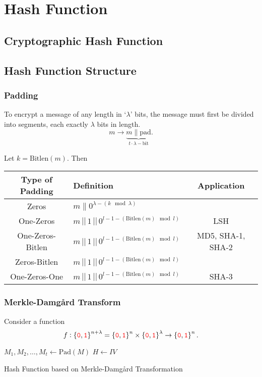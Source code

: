 \chapter{Hash Function}

\section{Cryptographic Hash Function}
\section{Hash Function Structure}

\subsection{Padding}
To encrypt a message of any length in `$\lambda$' bits, the message must first be divided into segments, each exactly $\lambda$ bits in length. \[
m\longrightarrow\underbrace{m\parallel\text{pad}}_{t\cdot\lambda-\text{bit}}.
\]

Let $k=\text{Bitlen}(m)$. Then

\begin{table}[h!]\centering\renewcommand{\arraystretch}{1.25} %
\begin{tabularx}{\textwidth}{@{\extracolsep{\fill}}cXc}
	\hline
	\textbf{Type of Padding} & \textbf{Definition} & \textbf{Application} \\
	\hline
	Zeros & \( m\parallel 0^{\lambda - (k \mod \lambda)} \) & \\
	\hline
	One-Zeros & \( m \,||\, 1 \,||\, 0^{l-1 - (\text{Bitlen}(m) \mod l)} \) & LSH \\
	\hline
	One-Zeros-Bitlen & \( m \,||\, 1 \,||\, 0^{l-1 - (\text{Bitlen}(m) \mod l)} \) & MD5, SHA-1, SHA-2 \\
	\hline
	Zeros-Bitlen & \( m \,||\, 1 \,||\, 0^{l-1 - (\text{Bitlen}(m) \mod l)} \) &  \\
	\hline
	One-Zeros-One & \( m \,||\, 1 \,||\, 0^{l-1 - (\text{Bitlen}(m) \mod l)} \) & SHA-3 \\
	\hline
\end{tabularx}
\end{table}

\subsection{Merkle-Damgård Transform}

Consider a function \[
f:\set{\textcolor{red}{\texttt{0}},\textcolor{red}{\texttt{1}}}^{n+\lambda}=\set{\textcolor{red}{\texttt{0}},\textcolor{red}{\texttt{1}}}^{n}\times\set{\textcolor{red}{\texttt{0}},\textcolor{red}{\texttt{1}}}^\lambda\to\set{\textcolor{red}{\texttt{0}},\textcolor{red}{\texttt{1}}}^n.
\]

\begin{algorithm}[H]
	\SetAlgoLined
	\BlankLine
	$M_1,M_2,\dots, M_t\gets\text{Pad}(M)$
	$H\gets IV$
	\;
	\caption{Hash Function based on Merkle-Damgård Transformation}
\end{algorithm}
